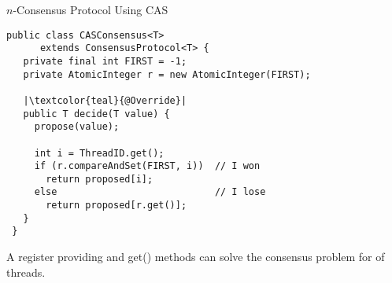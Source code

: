\begin{frame}{}
  \centerline{\LARGE $n$-Consensus Protocol Using \textsf{CAS}}

\end{frame}

\begin{frame}[fragile]{}
  \begin{lstlisting}[style = JavaStyle]
 public class CASConsensus<T> 
      extends ConsensusProtocol<T> {
   private final int FIRST = -1;
   private AtomicInteger r = new AtomicInteger(FIRST);

   |\textcolor{teal}{@Override}|
   public T decide(T value) {
     propose(value);

     int i = ThreadID.get();
     if (r.compareAndSet(FIRST, i))  // I won
       return proposed[i];
     else                            // I lose
       return proposed[r.get()];
   }
 }
  \end{lstlisting}
\end{frame}

\begin{frame}{}
  \begin{theorem}
    A register providing  and \textsf{get()} methods
    can solve the consensus problem for  of threads.
  \end{theorem}
\end{frame}
